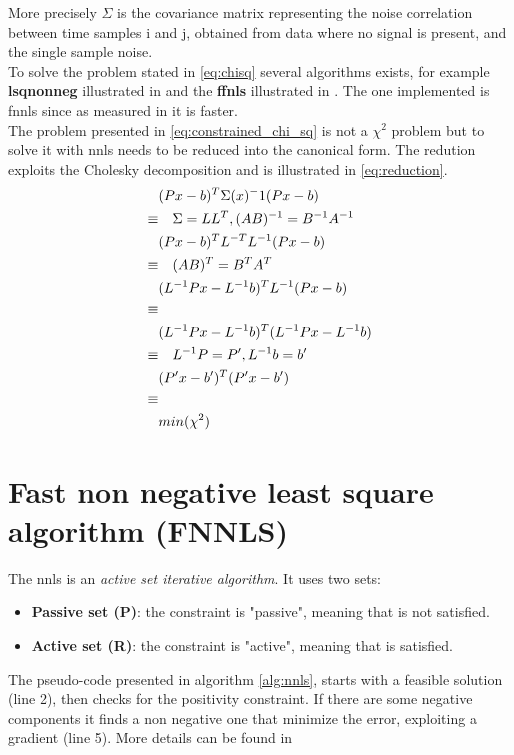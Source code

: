 More precisely $\Sigma$ is the covariance matrix representing the noise correlation between time samples i and j, obtained from data where no signal is present, and the single sample noise.\\
To solve the problem stated in \ref{eq:chisq} several algorithms exists, for example \textbf{lsqnonneg} illustrated in \cite{nnls} and the \textbf{ffnls} illustrated in \cite{fnnls}. The one implemented is fnnls since as measured in \cite{Chen09nonnegativityconstraints} it is faster.\\
The problem presented in \ref{eq:constrained_chi_sq} is not a $\chi^2$ problem but to solve it with nnls needs to be reduced into the canonical form. The redution exploits the Cholesky decomposition and is illustrated in \ref{eq:reduction}.
\begin{equation}\label{eq:reduction}
  \begin{split}
  & (Px-b)^T\Sigma(x)^-1(Px-b)\\
  \equiv &\quad \Sigma=LL^T,\space (AB)^{-1} = B^{-1} A^{-1}\\
  & (Px-b)^T L^{-T} L^{-1} (Px-b)\\
  \equiv &\quad (AB)^T = B^T A^T \\
  & (L^{-1}Px-L^{-1}b)^T  L^{-1} (Px-b)\\
  \equiv & \\
  & (L^{-1}Px-L^{-1}b)^T (L^{-1}Px-L^{-1}b)\\
  \equiv &\quad L^{-1}P=P', \space L^{-1}b=b' \\
  & (P'x-b')^T(P'x-b')\\
  \equiv & \\
  & min(\chi^2)
  \end{split}
\end{equation}

\section{Fast non negative least square algorithm (FNNLS)}
The nnls is an \textit{active set iterative algorithm}. It uses two sets: 
\begin{itemize}   
\item \textbf{Passive set (P)}: the constraint is "passive", meaning that is not satisfied.   
\item \textbf{Active set (R)}:  the constraint is "active", meaning that is satisfied.   
\end{itemize}   
The pseudo-code presented in algorithm \ref{alg:nnls}, starts with a feasible solution (line 2), then checks for the positivity constraint. If there are some negative components it finds a non negative one that minimize the error, exploiting a gradient (line 5). More details can be found in \cite{nnls}

